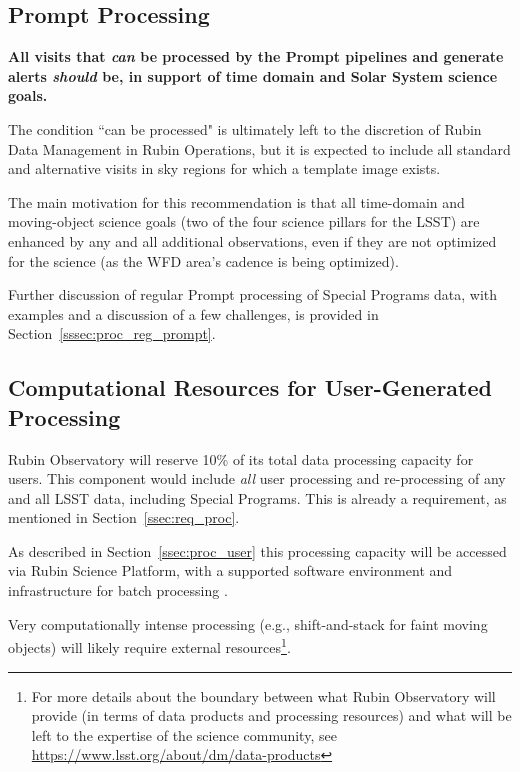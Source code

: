 \subsection{Prompt Processing}\label{ssec:sci_pproc}

\textbf{All visits that \emph{can} be processed by the Prompt pipelines and generate 
alerts \emph{should} be, in support of time domain and Solar System science goals.}

The condition ``can be processed" is ultimately left to the discretion of
Rubin Data Management in Rubin Operations, but it is expected to include
all standard and alternative visits in sky regions for which a template image exists.

The main motivation for this recommendation is that all time-domain and 
moving-object science goals (two of the four science pillars for the LSST) are
enhanced by any and all additional observations, even if they are not
optimized for the science (as the WFD area's cadence is being optimized).

Further discussion of regular Prompt processing of Special Programs data, with
examples and a discussion of a few challenges,
is provided in Section~\ref{sssec:proc_reg_prompt}.

\subsection{Computational Resources for User-Generated Processing}\label{ssec:sci_comp}

Rubin Observatory will reserve 10\% of its total data processing capacity for users.
This component would include {\it all} user processing and re-processing of any and 
all LSST data, including Special Programs. 
This is already a requirement, as mentioned in Section~\ref{ssec:req_proc}.

As described in Section~\ref{ssec:proc_user} this processing capacity will be 
accessed via Rubin Science Platform, with a supported software environment and 
infrastructure for batch processing .

Very computationally intense processing (e.g., shift-and-stack for faint moving 
objects) will likely require external resources\footnote{For more details about 
the boundary between what Rubin Observatory will provide (in terms of data products 
and processing resources) and what will be left to the expertise of the science community, 
see \url{https://www.lsst.org/about/dm/data-products}}.


